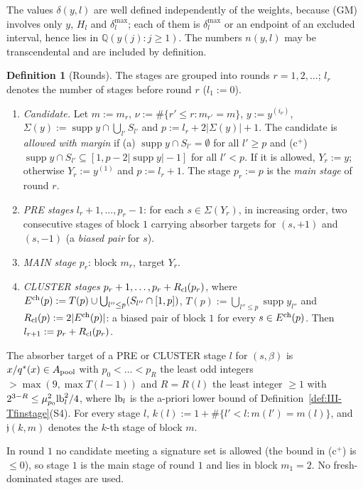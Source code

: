 \documentclass[10pt]{amsart}
\theoremstyle{definition}
\newtheorem{definition}[theorem]{Definition}
\theoremstyle{remark}
\newcommand{\supp}{\operatorname{supp}}
\begin{document}
The values $\delta(y,l)$ are well defined independently of the weights,
because (GM) involves only $y$, $H_l$ and $\delta^{\max}_l$; each of them is
$\delta^{\max}_l$ or an endpoint of an excluded interval, hence lies in
$\mathbb Q(y(j):j\ge1)$.  The numbers $n(y,l)$ may be transcendental and are
included by definition.

\begin{definition}[Rounds]\label{def:III-Tfinrounds}
The stages are grouped into rounds $r=1,2,\dots$; $l_r$ denotes the number of
stages before round $r$ ($l_1:=0$).
\begin{enumerate}
\item[(r.1)] \emph{Candidate.}  Let $m:=m_r$, $\nu:=\#\{r'\le r:m_{r'}=m\}$,
$y:=y^{(i_\nu)}$, $\Sigma(y):=\supp y\cap\bigcup_{l'}S_{l'}$ and $p:=l_r+
2|\Sigma(y)|+1$.  The candidate is \emph{allowed with margin} if
(a) $\supp y\cap S_{l'}=\emptyset$ for all $l'\ge p$ and (c$^+$) $\supp y\cap
S_{l'}\subseteq[1,p-2|\supp y|-1]$ for all $l'<p$.  If it is allowed, $Y_r:=y$;
otherwise $Y_r:=y^{(1)}$ and $p:=l_r+1$.  The stage $p_r:=p$ is the \emph{main
stage} of round $r$.
\item[(r.2)] \emph{PRE stages} $l_r+1,\dots,p_r-1$: for each $s\in\Sigma(Y_r)$, in
increasing order, two consecutive stages of block $1$ carrying absorber
targets for $(s,+1)$ and $(s,-1)$ (a \emph{biased pair} for $s$).
\item[(r.3)] \emph{MAIN stage} $p_r$: block $m_r$, target $Y_r$.
\item[(r.4)] \emph{CLUSTER stages} $p_r+1,\dots,p_r+R_{\rm cl}(p_r)$, where
$E^{\rm ch}(p):=T(p)\cup\bigcup_{l''\le p}(S_{l''}\cap[1,p])$, $T(p):=\bigcup_{l''
\le p}\supp y_{l''}$ and $R_{\rm cl}(p):=2|E^{\rm ch}(p)|$: a biased pair of block
$1$ for every $s\in E^{\rm ch}(p)$.  Then $l_{r+1}:=p_r+R_{\rm cl}(p_r)$.
\end{enumerate}
The absorber target of a PRE or CLUSTER stage $l$ for $(s,\beta)$ is
$x/q^*(x)\in A_{\rm pool}$ with $p_0<\dots<p_R$ the least odd integers
$>\max(9,\max T(l-1))$ and $R=R(l)$ the least integer $\ge1$ with
$2^{3-R}\le\mu_{p_0}^2{\rm lb}_l^2/4$, where ${\rm lb}_l$ is the a-priori lower
bound of Definition~\ref{def:III-Tfinstage}(S4).  For every stage $l$, $k(l):=1+
\#\{l'<l:m(l')=m(l)\}$, and $\mathfrak j(k,m)$ denotes the $k$-th stage of
block $m$.
\end{definition}

In round $1$ no candidate meeting a signature set is allowed (the bound in
(c$^+$) is $\le0$), so stage $1$ is the main stage of round $1$ and lies in
block $m_1=2$.  No fresh-dominated stages are used.
\end{document}
